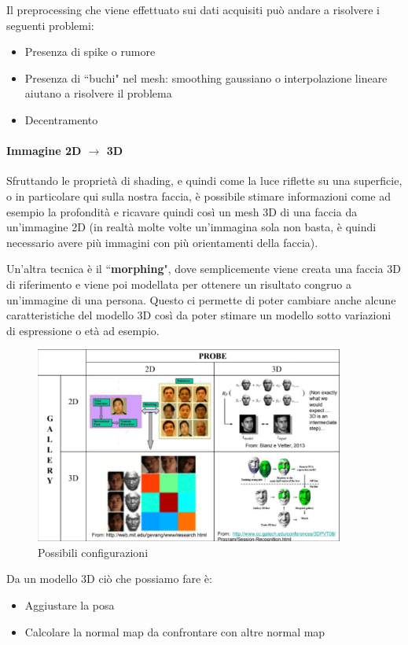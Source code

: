 \documentclass{article}
\begin{document}
Il preprocessing che viene effettuato sui dati acquisiti può andare a risolvere i seguenti problemi:
\begin{itemize}
    \item Presenza di spike o rumore
    \item Presenza di ``buchi" nel mesh: smoothing gaussiano o interpolazione lineare aiutano a risolvere il problema
    \item Decentramento
\end{itemize}

\paragraph{Immagine 2D $\rightarrow$ 3D} Sfruttando le proprietà di shading, e quindi come la luce riflette su una superficie, o in particolare qui sulla nostra faccia, è possibile stimare informazioni come ad esempio la profondità e ricavare quindi così un mesh 3D di una faccia da un'immagine 2D (in realtà molte volte un'immagina sola non basta, è quindi necessario avere più immagini con più orientamenti della faccia).

\bigskip
Un'altra tecnica è il ``\textbf{morphing}", dove semplicemente viene creata una faccia 3D di riferimento e viene poi modellata per ottenere un risultato congruo a un'immagine di una persona. Questo ci permette di poter cambiare anche alcune caratteristiche del modello 3D così da poter stimare un modello sotto variazioni di espressione o età ad esempio.

\begin{figure}[H]
    \centering
    \includegraphics[width=4in]{imgs/2d3d.PNG}
    \caption{Possibili configurazioni}
    \label{fig:2d3dconf}
\end{figure}

Da un modello 3D ciò che possiamo fare è:
\begin{itemize}
    \item Aggiustare la posa
    \item Calcolare la normal map da confrontare con altre normal map
\end{itemize}
\end{document}
